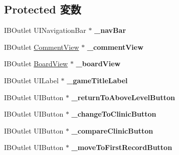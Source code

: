 \subsection*{Protected 変数}
\begin{DoxyCompactItemize}
\item 
\hypertarget{interface_abstract_record_view_controller_a13dde1eb5f4219b5969cd4ee21f290c7}{
IBOutlet UINavigationBar $\ast$ {\bfseries \_\-navBar}}
\label{interface_abstract_record_view_controller_a13dde1eb5f4219b5969cd4ee21f290c7}

\item 
\hypertarget{interface_abstract_record_view_controller_a21fc7774c20031d2e61e5641da05771a}{
IBOutlet \hyperlink{interface_comment_view}{CommentView} $\ast$ {\bfseries \_\-commentView}}
\label{interface_abstract_record_view_controller_a21fc7774c20031d2e61e5641da05771a}

\item 
\hypertarget{interface_abstract_record_view_controller_a7561ef44a265422a44b80e4e06e6432d}{
IBOutlet \hyperlink{interface_board_view}{BoardView} $\ast$ {\bfseries \_\-boardView}}
\label{interface_abstract_record_view_controller_a7561ef44a265422a44b80e4e06e6432d}

\item 
\hypertarget{interface_abstract_record_view_controller_aa5366410d1844c2b0635e914c09d2748}{
IBOutlet UILabel $\ast$ {\bfseries \_\-gameTitleLabel}}
\label{interface_abstract_record_view_controller_aa5366410d1844c2b0635e914c09d2748}

\item 
\hypertarget{interface_abstract_record_view_controller_a80f03fc22b3a42dbb18be8f35ac17792}{
IBOutlet UIButton $\ast$ {\bfseries \_\-returnToAboveLevelButton}}
\label{interface_abstract_record_view_controller_a80f03fc22b3a42dbb18be8f35ac17792}

\item 
\hypertarget{interface_abstract_record_view_controller_ad9e9358af1d5b00add9326ad42445b28}{
IBOutlet UIButton $\ast$ {\bfseries \_\-changeToClinicButton}}
\label{interface_abstract_record_view_controller_ad9e9358af1d5b00add9326ad42445b28}

\item 
\hypertarget{interface_abstract_record_view_controller_a800aaf69a6d1ddc48e53713db3e6e82d}{
IBOutlet UIButton $\ast$ {\bfseries \_\-compareClinicButton}}
\label{interface_abstract_record_view_controller_a800aaf69a6d1ddc48e53713db3e6e82d}

\item 
\hypertarget{interface_abstract_record_view_controller_a5eae56a73770a200995c407f60da2fe2}{
IBOutlet UIButton $\ast$ {\bfseries \_\-moveToFirstRecordButton}}
\label{interface_abstract_record_view_controller_a5eae56a73770a200995c407f60da2fe2}


\end{DoxyCompactItemize}
